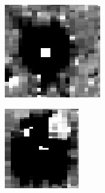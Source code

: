 \documentclass[a4paper, 12pt, titlepage, oneside, french]{article}
\begin{document}
	\begin{figure}[]%
		\centering
		\begin{subfigure}[b]{0.3\linewidth}
			\includegraphics[width=\linewidth]{DipoleExemple1.png}
		\end{subfigure}
		\begin{subfigure}[b]{0.3\linewidth}
			\includegraphics[width=\linewidth]{DipoleExemple2.png}

\end{subfigure}
\end{figure}
\end{document}
